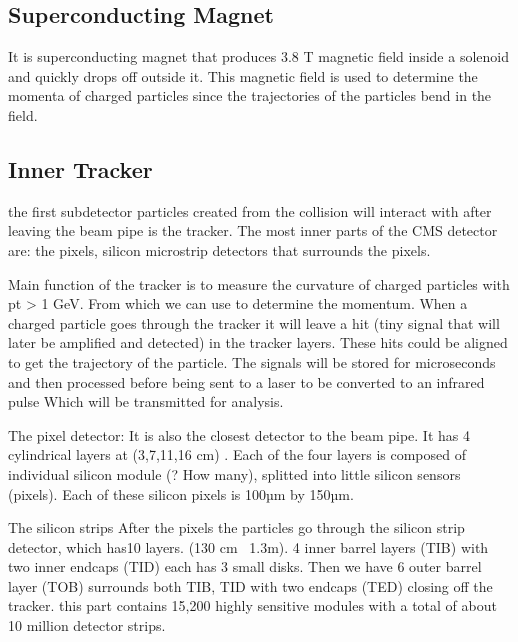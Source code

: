 \subsection{Superconducting Magnet}
It is superconducting magnet that produces 3.8 T magnetic field inside a solenoid and quickly drops off outside it. This magnetic field is used to determine the momenta of charged particles since the trajectories of the particles bend in the field.
\subsection{Inner Tracker}
the first subdetector particles created from the collision will interact with after leaving the beam pipe is the tracker. The most inner parts of the CMS detector are: the pixels, silicon microstrip detectors that surrounds the pixels.

Main function of the tracker is to measure the curvature of charged particles with pt > 1 GeV. From which we can use to determine the momentum. When a charged particle goes through the tracker it will leave a hit (tiny signal that will later be amplified and detected) in the tracker layers. These hits could be aligned to get the trajectory of the particle. The signals will be stored for microseconds and then processed before being sent to a laser to be converted to an infrared pulse Which will be transmitted for analysis.

The pixel detector:
It is also the closest detector to the beam pipe. It has 4 cylindrical layers at (3,7,11,16 cm) . Each of the four layers is composed of individual silicon module (? How many), splitted into little silicon sensors (pixels).  Each of these silicon pixels is 100µm by 150µm.

The silicon strips
After the pixels the particles go through the silicon strip detector, which has10 layers. (130 cm~ 1.3m). 4 inner barrel layers (TIB) with two inner endcaps (TID) each has 3 small disks. Then we have 6 outer barrel layer (TOB) surrounds both TIB, TID with two endcaps (TED) closing off the tracker. this part contains 15,200 highly sensitive modules with a total of about 10 million detector strips.

